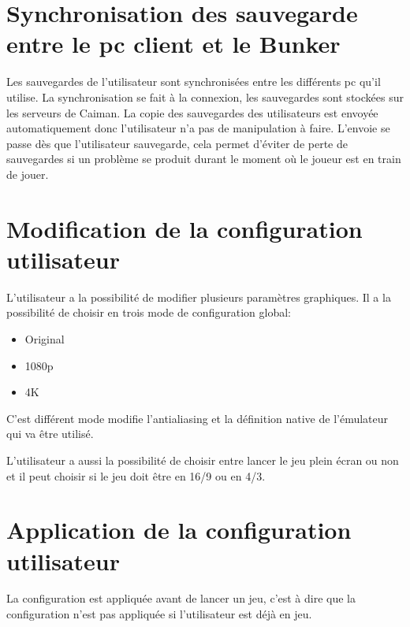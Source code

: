 \documentclass[a4paper,12pt,french]{sphinxmanual}
\begin{document}
\sphinxAtStartPar
{}


\section{Synchronisation des sauvegarde entre le pc client et le Bunker}
\label{\detokenize{fonctionnelleC_:synchronisation-des-sauvegarde-entre-le-pc-client-et-le-bunker}}
\sphinxAtStartPar
Les sauvegardes de l’utilisateur sont synchronisées entre les différents pc qu’il utilise. La synchronisation se fait à la connexion, les sauvegardes sont stockées sur les serveurs de Caiman. La copie des sauvegardes des utilisateurs est envoyée automatiquement donc l’utilisateur n’a pas de manipulation à faire. L’envoie se passe dès que l’utilisateur sauvegarde, cela permet d’éviter de perte de sauvegardes si un problème se produit durant le moment où le joueur est en train de jouer.


\section{Modification de la configuration utilisateur}
\label{\detokenize{fonctionnelleC_:modification-de-la-configuration-utilisateur}}
\sphinxAtStartPar
L’utilisateur a la possibilité de modifier plusieurs paramètres graphiques. Il a la possibilité de choisir en trois mode de configuration global:
\begin{itemize}
\item {} 
\sphinxAtStartPar
Original

\item {} 
\sphinxAtStartPar
1080p

\item {} 
\sphinxAtStartPar
4K

\end{itemize}

\sphinxAtStartPar
C’est différent mode modifie l’antialiasing et la définition native de l’émulateur qui va être utilisé.

\sphinxAtStartPar
L’utilisateur a aussi la possibilité de choisir entre lancer le jeu plein écran ou non et il peut choisir si le jeu doit être en 16/9 ou en 4/3.

\sphinxAtStartPar
{}


\section{Application de la configuration utilisateur}
\label{\detokenize{fonctionnelleC_:application-de-la-configuration-utilisateur}}
\sphinxAtStartPar
La configuration est appliquée avant de lancer un jeu, c’est à dire que la configuration n’est pas appliquée si l’utilisateur est déjà en jeu.
\end{document}
